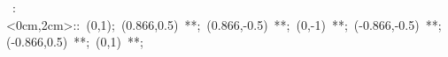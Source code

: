\hbox{
\xy    <2cm,0cm>:<0cm,2cm>::
       (0,1); (0.866,0.5) **\dir{-};
       (0.866,-0.5) **\dir{-}; (0,-1) **\dir{-};
       (-0.866,-0.5) **\dir{-}; (-0.866,0.5) **\dir{-};
       (0,1) **\dir{-};
\endxy}
